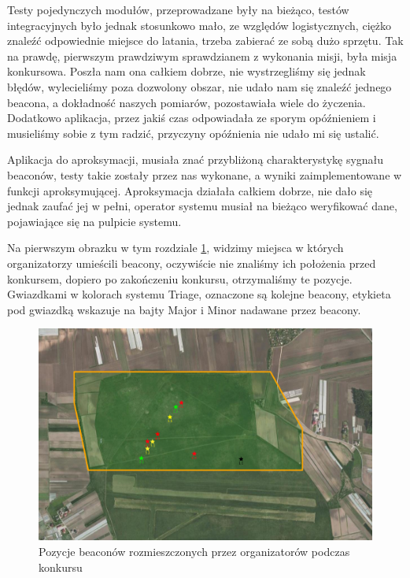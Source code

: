 Testy pojedynczych modułów, przeprowadzane były na bieżąco, testów integracyjnych było jednak stosunkowo mało, ze względów logistycznych, ciężko znaleźć odpowiednie miejsce do latania, trzeba zabierać ze sobą dużo sprzętu. Tak na prawdę, pierwszym prawdziwym sprawdzianem z wykonania misji, była misja konkursowa. Poszła nam ona całkiem dobrze, nie wystrzegliśmy się jednak błędów, wylecieliśmy poza dozwolony obszar, nie udało nam się znaleźć jednego beacona, a dokładność naszych pomiarów, pozostawiała wiele do życzenia. Dodatkowo aplikacja, przez jakiś czas odpowiadała ze sporym opóźnieniem i musieliśmy sobie z tym radzić, przyczyny opóźnienia nie udało mi się ustalić.

Aplikacja do aproksymacji, musiała znać przybliżoną charakterystykę sygnału beaconów, testy takie zostały przez nas wykonane, a wyniki zaimplementowane w funkcji aproksymującej. Aproksymacja działała całkiem dobrze, nie dało się jednak zaufać jej w pełni, operator systemu musiał na bieżąco weryfikować dane, pojawiające się na pulpicie systemu.

Na pierwszym obrazku w tym rozdziale \ref{fig:beaconykonkursowe}, widzimy miejsca w których organizatorzy umieścili beacony, oczywiście nie znaliśmy ich położenia przed konkursem, dopiero po zakończeniu konkursu, otrzymaliśmy te pozycje. Gwiazdkami w kolorach systemu Triage, oznaczone są kolejne beacony, etykieta pod gwiazdką wskazuje na bajty Major i Minor nadawane przez beacony.

\begin{figure}[!th]
    \centering
    \includegraphics[width=15cm]{zalaczniki/obrazy/beacony_konkursowe.png}
    \caption{Pozycje beaconów rozmieszczonych przez organizatorów podczas konkursu}
    \label{fig:beaconykonkursowe}
\end{figure}

